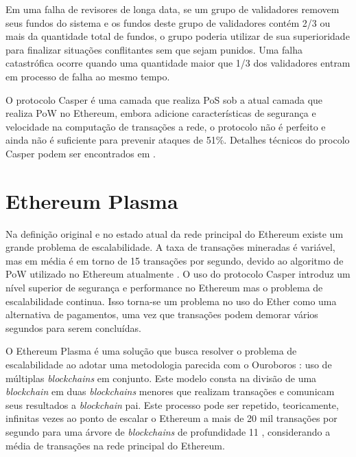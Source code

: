 \documentclass[tcc,capa]{texufpel}
\begin{document}
    Em uma falha de revisores de longa data, se um grupo de validadores removem seus fundos do sistema e os fundos deste grupo de validadores contém 2/3 ou mais da quantidade total de fundos, o grupo poderia utilizar de sua superioridade para finalizar situações conflitantes sem que sejam punidos. Uma falha catastrófica ocorre quando uma quantidade maior que 1/3 dos validadores entram em processo de falha ao mesmo tempo.
    
    O protocolo Casper é uma camada que realiza PoS sob a atual camada que realiza PoW no Ethereum, embora adicione características de segurança e velocidade na computação de transações a rede, o protocolo não é perfeito e ainda não é suficiente para prevenir ataques de 51\%. Detalhes técnicos do procolo Casper podem ser encontrados em \cite{buterin2017}.
    
    
    \section{Ethereum Plasma}\label{ssc:ethereum-plasma}
    
    Na definição original e no estado atual da rede principal do Ethereum existe um grande problema de escalabilidade. A taxa de transações mineradas é variável, mas em média é em torno de 15 transações por segundo, devido ao algoritmo de PoW utilizado no Ethereum atualmente \cite{bach2018comparative}. O uso do protocolo Casper introduz um nível superior de segurança e performance no Ethereum mas o problema de escalabilidade continua. Isso torna-se um problema no uso do Ether como uma alternativa de pagamentos, uma vez que transações podem demorar vários segundos para serem concluídas.
    
    O Ethereum Plasma é uma solução que busca resolver o problema de escalabilidade ao adotar uma metodologia parecida com o Ouroboros \cite{kiayias2017ouroboros}: uso de múltiplas \textit{blockchains} em conjunto. Este modelo consta na divisão de uma \textit{blockchain} em duas \textit{blockchains} menores que realizam transações e comunicam seus resultados a \textit{blockchain} pai. Este processo pode ser repetido, teoricamente, infinitas vezes ao ponto de escalar o Ethereum a mais de 20 mil transações por segundo para uma árvore de \textit{blockchains} de profundidade 11 \cite{poon2017plasma}, considerando a média de transações na rede principal do Ethereum.
    
\end{document}

